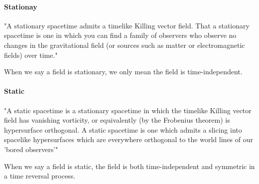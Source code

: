 \documentclass[12pt,a4paper]{book}
\begin{document}
\paragraph{Stationay}
"A stationary spacetime admits a timelike Killing vector field. That a stationary spacetime is one in which you can find a family of observers who observe no changes in the gravitational field (or sources such as matter or electromagnetic fields) over time."

When we say a field is stationary, we only mean the field is time-independent.

\paragraph{Static}
"A static spacetime is a stationary spacetime in which the timelike Killing vector field has vanishing vorticity, or equivalently (by the Frobenius theorem) is hypersurface orthogonal. A static spacetime is one which admits a slicing into spacelike hypersurfaces which are everywhere orthogonal to the world lines of our 'bored observers'"

When we say a field is static, the field is both time-independent and symmetric in a time reversal process.
\end{document}
